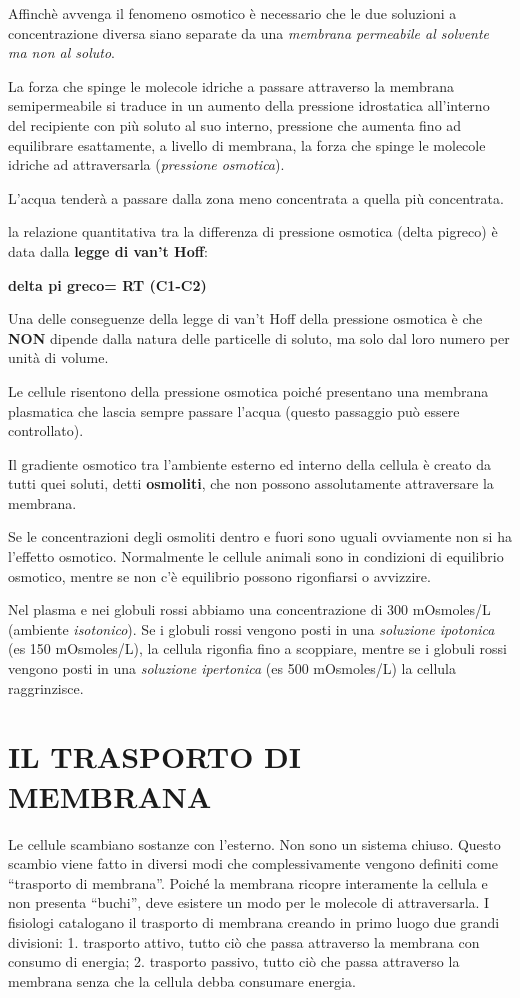 \documentclass[]{article}
\begin{document}
Affinchè avvenga il fenomeno osmotico è necessario che le due soluzioni
a concentrazione diversa siano separate da una \emph{membrana permeabile
al solvente ma non al soluto}.

La forza che spinge le molecole idriche a passare attraverso la membrana
semipermeabile si traduce in un aumento della pressione idrostatica
all'interno del recipiente con più soluto al suo interno, pressione che
aumenta fino ad equilibrare esattamente, a livello di membrana, la forza
che spinge le molecole idriche ad attraversarla (\emph{pressione
osmotica}).

L'acqua tenderà a passare dalla zona meno concentrata a quella più
concentrata.

la relazione quantitativa tra la differenza di pressione osmotica (delta
pigreco) è data dalla \textbf{legge di van't Hoff}:

\textbf{delta pi greco= RT (C1-C2)}

Una delle conseguenze della legge di van't Hoff della pressione osmotica
è che \textbf{NON} dipende dalla natura delle particelle di soluto, ma
solo dal loro numero per unità di volume.

Le cellule risentono della pressione osmotica poiché presentano una
membrana plasmatica che lascia sempre passare l'acqua (questo passaggio
può essere controllato).

Il gradiente osmotico tra l'ambiente esterno ed interno della cellula è
creato da tutti quei soluti, detti \textbf{osmoliti}, che non possono
assolutamente attraversare la membrana.

Se le concentrazioni degli osmoliti dentro e fuori sono uguali
ovviamente non si ha l'effetto osmotico. Normalmente le cellule animali
sono in condizioni di equilibrio osmotico, mentre se non c'è equilibrio
possono rigonfiarsi o avvizzire.

Nel plasma e nei globuli rossi abbiamo una concentrazione di 300
mOsmoles/L (ambiente \emph{isotonico}). Se i globuli rossi vengono posti
in una \emph{soluzione ipotonica} (es 150 mOsmoles/L), la cellula
rigonfia fino a scoppiare, mentre se i globuli rossi vengono posti in
una \emph{soluzione ipertonica} (es 500 mOsmoles/L) la cellula
raggrinzisce.

\section{IL TRASPORTO DI MEMBRANA}\label{il-trasporto-di-membrana}

Le cellule scambiano sostanze con l'esterno. Non sono un sistema chiuso.
Questo scambio viene fatto in diversi modi che complessivamente vengono
definiti come ``trasporto di membrana''. Poiché la membrana ricopre
interamente la cellula e non presenta ``buchi'', deve esistere un modo
per le molecole di attraversarla. I fisiologi catalogano il trasporto di
membrana creando in primo luogo due grandi divisioni: 1. trasporto
attivo, tutto ciò che passa attraverso la membrana con consumo di
energia; 2. trasporto passivo, tutto ciò che passa attraverso la
membrana senza che la cellula debba consumare energia.
\end{document}
